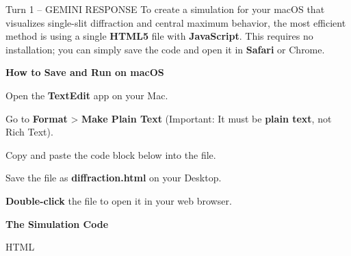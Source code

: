 \documentclass[10pt,a4paper]{article}
\begin{document}
\begin{aibox}{Turn 1 -- GEMINI RESPONSE}
To create a simulation for your macOS that visualizes single-slit diffraction and central maximum behavior, the most efficient method is using a single \textbf{HTML5} file with \textbf{JavaScript}. This requires no installation; you can simply save the code and open it in \textbf{Safari} or Chrome.

\textbf{\large How to Save and Run on macOS}

Open the \textbf{TextEdit} app on your Mac.

Go to \textbf{Format} > \textbf{Make Plain Text} (Important: It must be \textbf{plain text}, not Rich Text).

Copy and paste the code block below into the file.

Save the file as \textbf{diffraction.html} on your Desktop.

\textbf{Double-click} the file to open it in your web browser.

\textbf{\large The Simulation Code}

HTML

\end{aibox}
\end{document}
